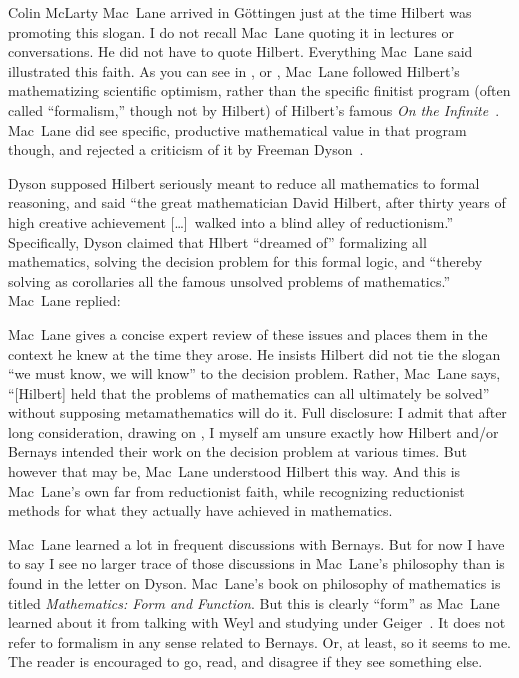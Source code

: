 \begin{artengenv}{Colin McLarty}
Mac~Lane arrived in G\"ottingen just at the time Hilbert was promoting this slogan.  I do not recall Mac~Lane quoting it in lectures or conversations.  He did not have to quote Hilbert.  Everything Mac~Lane said illustrated this faith.  As you can see in \textcite{MFF,MacLAuto}, or \textcite{McLSaundersLast}, Mac~Lane followed Hilbert's mathematizing scientific optimism, rather than the specific finitist program (often called ``formalism,'' though not by Hilbert) of Hilbert's famous \textit{On the Infinite}~\parencite*{HilbUnend}.  Mac~Lane did see specific, productive mathematical value in that program though, and rejected a criticism of it by Freeman Dyson~\parencite{MacLDyson}.

Dyson supposed Hilbert seriously meant to reduce all mathematics to formal reasoning, and said ``the great mathematician David Hilbert, after thirty years of high creative achievement [\dots]\ walked into a blind alley of reductionism.''  Specifically, Dyson claimed that Hlbert ``dreamed of'' formalizing all mathematics, solving the decision problem for this formal logic, and ``thereby solving as corollaries all the famous unsolved problems of mathematics.''  Mac~Lane replied:

Mac~Lane gives a concise expert review of these issues and places them in the context he knew at the time they arose.  He insists Hilbert did not tie the slogan ``we must know, we will know'' to the decision problem.  Rather, Mac~Lane says, ``[Hilbert] held that the problems of mathematics can all ultimately be solved'' without supposing metamathematics will do it. Full disclosure: I admit that after long consideration, drawing on \textcite{SiegProg,SiegBook}, I myself am unsure exactly how Hilbert and/or Bernays intended their work on the decision problem at various times. But however that may be, Mac~Lane understood Hilbert this way.  And this is Mac~Lane's own far from reductionist faith, while recognizing reductionist methods for what they actually have achieved in mathematics.

Mac~Lane learned a lot in frequent discussions with Bernays.  But for now I have to say I see no larger trace of those discussions in Mac~Lane's philosophy than is found in the letter on Dyson.  Mac~Lane's book on philosophy of mathematics is titled \textit{Mathematics: Form and Function}.  But this is clearly ``form'' as Mac~Lane learned about it from talking with Weyl and studying under Geiger~\parencite{McLSaundersLast}. It does not refer to formalism in any sense related to Bernays.  Or, at least, so it seems to me.  The reader is encouraged to go, read, and disagree if they see something else.




\end{artengenv}
